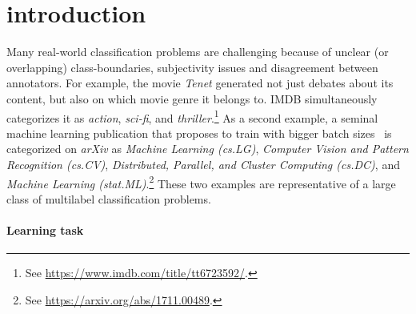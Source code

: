
\section{introduction}
\label{sec:org662677c}


Many real-world classification problems are challenging because of unclear (or overlapping) class-boundaries, subjectivity issues and disagreement between annotators.
For example, the movie \textit{Tenet} generated not just debates about its content, but also on which movie genre it belongs to. IMDB simultaneously categorizes it as \textit{action}, \textit{sci-fi}, and \textit{thriller}.\footnote{See \url{https://www.imdb.com/title/tt6723592/}.}
As a second example, a seminal machine learning publication that proposes to train with bigger batch sizes~\citep{bigBSArxiv} is categorized on \textit{arXiv} as \textit{Machine Learning (cs.LG)},
\textit{Computer Vision and Pattern Recognition (cs.CV)}, \textit{Distributed,
Parallel, and Cluster Computing (cs.DC)}, and \textit{Machine Learning
(stat.ML)}.\footnote{See \url{https://arxiv.org/abs/1711.00489}.}
These two examples are representative of a large class of multilabel classification problems.


\begin{comment}
\begin{enumerate}[label=(\arabic*),leftmargin=*]
\item The possibility of assigning more than one label to a single instance is desirable (i.e., labels are not mutually exclusive).
\item The instance being labeled needs to be inspected or consumed in its entirety before a full set of class labels can be determined. For example, it requires an entire viewing of the movie \textit{Tenet} to determine if the label \textit{romance} is appropriate, as it is arguably the underlying driver of the protagonists.
\item The number of labels differs per instance, making the number of labels to assign at inference time unknown.
\end{enumerate}
\end{comment}

\paragraph{Learning task}

